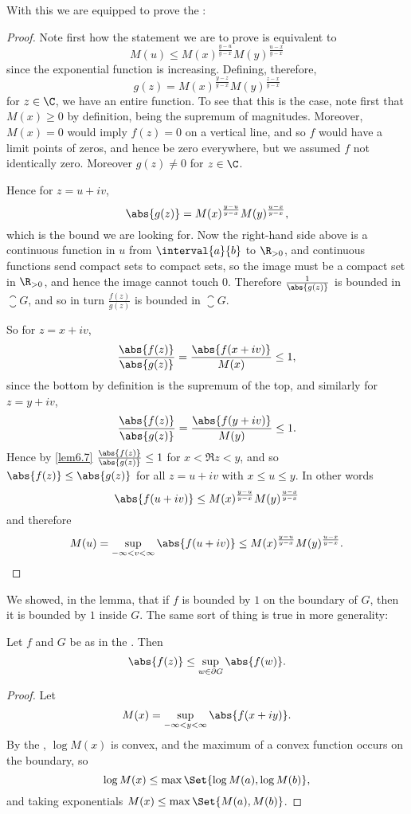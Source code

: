 With this we are equipped to prove the :

\begin{proof}
	Note first how the statement we are to prove is equivalent to
	\[
		M(u) \leq M(x)^{\frac{y - u}{y - x}} M(y)^{\frac{u - x}{y - x}}
	\]
	since the exponential function is increasing.
	Defining, therefore,
	\[
		g(z) = M(x)^{\frac{y - z}{y - x}} M(y)^{\frac{z - x}{y - x}}
	\]
	for $z \in \C$, we have an entire function.
	To see that this is the case, note first that $M(x) \geq 0$ by definition, being the supremum of magnitudes.
	Moreover, $M(x) = 0$ would imply $f(z) = 0$ on a vertical line, and so $f$ would have a limit points of zeros, and hence be zero everywhere, but we assumed $f$ not identically zero.
	Moreover $g(z) \neq 0$ for $z \in \C$.

	Hence for $z = u + i v$,
	\[
		\abs{g(z)} = M(x)^{\frac{y - u}{y - x}} M(y)^{\frac{u - x}{y - x}},
	\]
	which is the bound we are looking for.
	Now the right-hand side above is a continuous function in $u$ from $\interval{a}{b}$ to $\R_{> 0}$, and continuous functions send compact sets to compact sets, so the image must be a compact set in $\R_{> 0}$, and hence the image cannot touch $0$.
	Therefore $\frac{1}{\abs{g(z)}}$ is bounded in $\closure{G}$, and so in turn $\frac{f(z)}{g(z)}$ is bounded in $\closure{G}$.

	So for $z = x + i v$,
	\[
		\frac{\abs{f(z)}}{\abs{g(z)}} = \frac{\abs{f(x + i v)}}{M(x)} \leq 1,
	\]
	since the bottom by definition is the supremum of the top, and similarly for $z = y + i v$,
	\[
		\frac{\abs{f(z)}}{\abs{g(z)}} = \frac{\abs{f(y + i v)}}{M(y)} \leq 1.
	\]
	Hence by \autoref{lem6.7} $\frac{\abs{f(z)}}{\abs{g(z)}} \leq 1$ for $x < \Re z < y$, and so $\abs{f(z)} \leq \abs{g(z)}$ for all $z = u + i v$ with $x \leq u \leq y$.
	In other words
	\[
		\abs{f(u + i v)} \leq M(x)^{\frac{y - u}{y - x}} M(y)^{\frac{u - x}{y - x}}
	\]
	and therefore
	\[
		M(u) = \sup_{-\infty < v < \infty} \abs{f(u + i v)} \leq M(x)^{\frac{y - u}{y - x}} M(y)^{\frac{u - x}{y - x}}. \qedhere
	\]
\end{proof}

We showed, in the lemma, that if $f$ is bounded by $1$ on the boundary of $G$, then it is bounded by $1$ inside $G$.
The same sort of thing is true in more generality:

\begin{corollary}\label{cor6.8}
	Let $f$ and $G$ be as in the .
	Then
	\[
		\abs{f(z)} \leq \sup_{w \in \partial G} \abs{f(w)}.
	\]
\end{corollary}

\begin{proof}
	Let
	\[
		M(x) = \sup_{-\infty < y < \infty} \abs{f(x + i y)}.
	\]
	By the , $\log M(x)$ is convex, and the maximum of a convex function occurs on the boundary, so
	\[
		\log M(x) \leq \max\Set{\log M(a), \log M(b)},
	\]
	and taking exponentials $M(x) \leq \max\Set{M(a), M(b)}$.
\end{proof}
